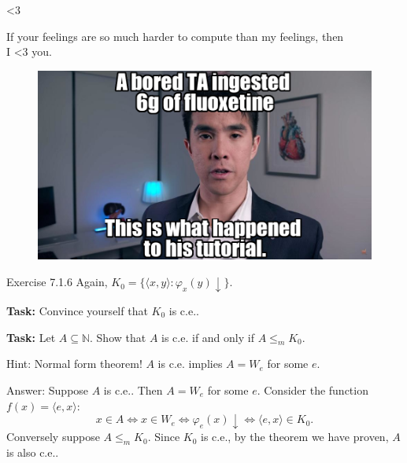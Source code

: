 \documentclass{beamer}
\begin{document}
\begin{frame}{\textless 3}
\begin{theorem}
\color{red}
If your feelings are so much harder to compute than my feelings, then\\ I \textless 3 you.
\end{theorem}

\begin{figure}[h]
\centering
\includegraphics[scale=0.3]{img/chubbyemu.png}
\end{figure}

\end{frame}

\begin{frame}{Exercise 7.1.6}
Again, $K_0 = \{\langle x, y \rangle: \varphi_x(y) \downarrow\}$.
\vspace{2mm}

\textbf{Task:} Convince yourself that $K_0$ is c.e..

\vspace{2mm}

\textbf{Task:} Let $A \subseteq \mathbb N$. Show that $A$ is c.e. if and only if $A \leq_m K_0$. 

\vspace{2mm}

Hint: Normal form theorem! $A$ is c.e. implies $A = W_e$ for some $e$. 

\vspace{2mm}

\pause
Answer: Suppose $A$ is c.e.. Then $A = W_e$ for some $e$. Consider the function $f(x) = \langle e, x\rangle$: 
$$x \in A \Leftrightarrow x \in W_e \Leftrightarrow \varphi_e(x) \downarrow \Leftrightarrow \langle e, x \rangle \in K_0.$$
Conversely suppose $A \leq_m K_0$. Since $K_0$ is c.e., by the theorem we have proven, $A$ is also c.e..

\end{frame}
\end{document}
